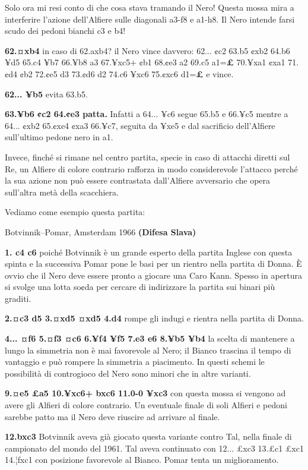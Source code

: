 \documentclass[
]{article}
\begin{document}
Solo ora mi resi conto di che cosa stava tramando il Nero! Questa mossa
mira a interferire l'azione dell'Alfiere sulle diagonali a3-f8 e a1-h8.
Il Nero intende farsi scudo dei pedoni bianchi c3 e b4!

\textbf{62.¤xb4} in caso di 62.axb4? il Nero vince davvero: 62... ¢c2
63.b5 ¢xb2 64.b6 ¥d5 65.c4 ¥b7 66.¥b8 a3 67.¥xc5+ ¢b1 68.¢e3 a2 69.c5
a1=\textbf{£} 70.¥xa1 ¢xa1 71.¢d4 ¢b2 72.¢e5 d3 73.¢d6 d2 74.c6 ¥xc6
75.¢xc6 d1=\textbf{£} e vince.

\textbf{62... ¥b5} evita 63.b5.

\textbf{63.¥b6 ¢c2 64.¢e3 patta.} Infatti a 64... ¥c6 segue 65.b5 e
66.¥c5 mentre a 64... ¢xb2 65.¢xe4 ¢xa3 66.¥c7, seguita da ¥xe5 e dal
sacrificio dell'Alfiere sull'ultimo pedone nero in a1.

Invece, finché si rimane nel centro partita, specie in caso di attacchi
diretti sul Re, un Alfiere di colore contrario rafforza in modo
considerevole l'attacco perché la sua azione non può essere contrastata
dall'Alfiere avversario che opera sull'altra metà della scacchiera.

Vediamo come esempio questa partita:

Botvinnik--Pomar, Amsterdam 1966 \textbf{(Difesa Slava)}

\textbf{1. c4 c6} poiché Botvinnik è un grande esperto della partita
Inglese con questa spinta e la successiva Pomar pone le basi per un
rientro nella partita di Donna. È ovvio che il Nero deve essere pronto a
giocare una Caro Kann. Spesso in apertura si svolge una lotta so¢da per
cercare di indirizzare la partita sui binari più graditi.

\textbf{2.¤c3 d5 3.¤xd5 ¤xd5 4.d4} rompe gli indugi e rientra nella
partita di Donna.

\textbf{4... ¤f6 5.¤f3 ¤c6 6.¥f4 ¥f5 7.e3 e6 8.¥b5 ¥b4} la scelta di
mantenere a lungo la simmetria non è mai favorevole al Nero; il Bianco
trascina il tempo di vantaggio e può rompere la simmetria a piacimento.
In questi schemi le possibilità di controgioco del Nero sono minori che
in altre varianti.

\textbf{9.¤e5 £a5 10.¥xc6+ bxc6 11.0-0 ¥xc3} con questa mossa si vengono
ad avere gli Alfieri di colore contrario. Un eventuale finale di soli
Alfieri e pedoni sarebbe patto ma il Nero deve riuscire ad arrivare al
finale.

\textbf{12.bxc3} Botvinnik aveva già giocato questa variante contro Tal,
nella finale di campionato del mondo del 1961. Tal aveva continuato con
12... £xc3 13.£c1 £xc1 14.¦fxc1 con posizione favorevole al Bianco.
Pomar tenta un miglioramento.
\end{document}

